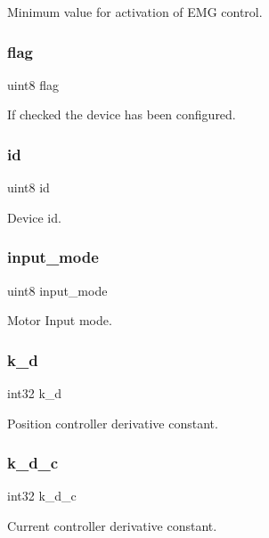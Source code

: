 Minimum value for activation of E\+MG control. \mbox{\label{structst__mem_af11e40d15a1361229a78e772af5b3c94}} 
\subsubsection{flag}
{\footnotesize\ttfamily uint8 flag}

If checked the device has been configured. \mbox{\label{structst__mem_a492bfda30c3852a68b2cbfba9531e3d1}} 
\subsubsection{id}
{\footnotesize\ttfamily uint8 id}

Device id. \mbox{\label{structst__mem_ae5cc8b2ae06016f1fcf5b2f964618a12}} 
\subsubsection{input\+\_\+mode}
{\footnotesize\ttfamily uint8 input\+\_\+mode}

Motor Input mode. \mbox{\label{structst__mem_ab9d15eaa4612dd1c5597e5634cd1d66c}} 
\subsubsection{k\+\_\+d}
{\footnotesize\ttfamily int32 k\+\_\+d}

Position controller derivative constant. \mbox{\label{structst__mem_af32cf4ebfb30ad068ea530d03ff9a96f}} 
\subsubsection{k\+\_\+d\+\_\+c}
{\footnotesize\ttfamily int32 k\+\_\+d\+\_\+c}

Current controller derivative constant. \mbox{\label{structst__mem_af8bfba55a00d54c9c2a9e4bb11484158}} 
